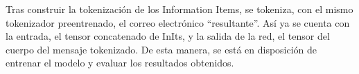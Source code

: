 Tras construir la tokenización de los Information Items, se tokeniza, con el mismo tokenizador preentrenado, el correo electrónico ``resultante''. Así ya se cuenta con la entrada, el tensor concatenado de InIts, y la salida de la red, el tensor del cuerpo del mensaje tokenizado. De esta manera, se está en disposición de entrenar el modelo y evaluar los resultados obtenidos.